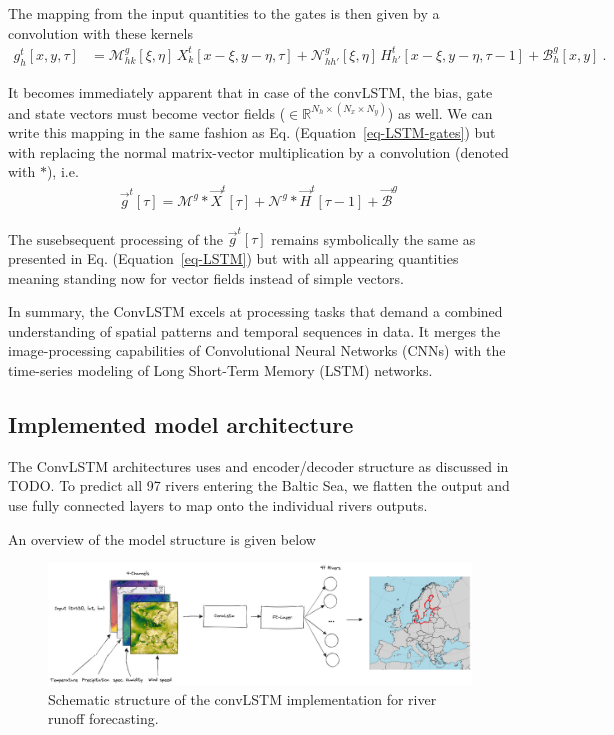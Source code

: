 \documentclass[
]{agujournal2019}
\begin{document}
The mapping from the input quantities to the gates is then given by a
convolution with these kernels \[
\begin{aligned}
g^t_h[x,y,\tau] & =  \mathcal{M}^{g}_{hk} [\xi,\eta]\, X^t_k[x-\xi, y-\eta, \tau]  +  \mathcal{N}^{g}_{hh'}[\xi,\eta] \, H^t_{h'}[x-\xi, y-\eta, \tau-1] + \mathcal{B}^g_{h}[x,y] \ .
\end{aligned}
\]

It becomes immediately apparent that in case of the convLSTM, the bias,
gate and state vectors must become vector fields
(\(\in \mathbb{R}^{N_h \times (N_x \times N_y)}\)) as well. We can write
this mapping in the same fashion as Eq. (Equation~\ref{eq-LSTM-gates})
but with replacing the normal matrix-vector multiplication by a
convolution (denoted with \(\ast\)), i.e.\\
\[
\begin{aligned}
\vec{g}^t[\tau] = \pmb{\mathcal{M}}^{g} \ast \vec{X}^t[\tau] + \pmb{\mathcal{N}}^{g} \ast  \vec{H}^t[ \tau-1]+ \vec{\mathcal{B}}^g \,
\end{aligned}
\]

The susebsequent processing of the \(\vec{g}^t[\tau]\) remains
symbolically the same as presented in Eq. (Equation~\ref{eq-LSTM}) but
with all appearing quantities meaning standing now for vector fields
instead of simple vectors.

In summary, the ConvLSTM excels at processing tasks that demand a
combined understanding of spatial patterns and temporal sequences in
data. It merges the image-processing capabilities of Convolutional
Neural Networks (CNNs) with the time-series modeling of Long Short-Term
Memory (LSTM) networks.

\hypertarget{implemented-model-architecture}{%
\subsection{Implemented model
architecture}\label{implemented-model-architecture}}

The ConvLSTM architectures uses and encoder/decoder structure as
discussed in TODO. To predict all 97 rivers entering the Baltic Sea, we
flatten the output and use fully connected layers to map onto the
individual rivers outputs.

An overview of the model structure is given below

\begin{figure}

{\centering \includegraphics{convLSTM.png}

}

\caption{\label{fig-baltNet}Schematic structure of the convLSTM
implementation for river runoff forecasting.}

\end{figure}
\end{document}
